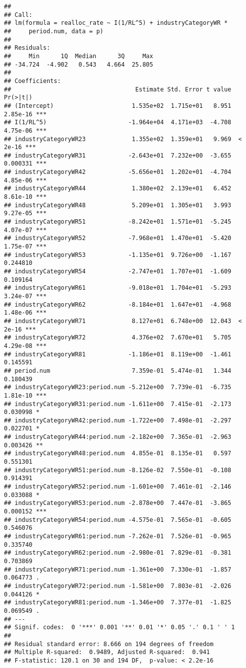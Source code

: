\documentclass[
]{article}
\begin{document}
\begin{verbatim}
## 
## Call:
## lm(formula = realloc_rate ~ I(1/RL^5) + industryCategoryWR * 
##     period.num, data = p)
## 
## Residuals:
##     Min      1Q  Median      3Q     Max 
## -34.724  -4.902   0.543   4.664  25.805 
## 
## Coefficients:
##                                   Estimate Std. Error t value Pr(>|t|)    
## (Intercept)                      1.535e+02  1.715e+01   8.951 2.85e-16 ***
## I(1/RL^5)                       -1.964e+04  4.171e+03  -4.708 4.75e-06 ***
## industryCategoryWR23             1.355e+02  1.359e+01   9.969  < 2e-16 ***
## industryCategoryWR31            -2.643e+01  7.232e+00  -3.655 0.000331 ***
## industryCategoryWR42            -5.656e+01  1.202e+01  -4.704 4.85e-06 ***
## industryCategoryWR44             1.380e+02  2.139e+01   6.452 8.61e-10 ***
## industryCategoryWR48             5.209e+01  1.305e+01   3.993 9.27e-05 ***
## industryCategoryWR51            -8.242e+01  1.571e+01  -5.245 4.07e-07 ***
## industryCategoryWR52            -7.968e+01  1.470e+01  -5.420 1.75e-07 ***
## industryCategoryWR53            -1.135e+01  9.726e+00  -1.167 0.244810    
## industryCategoryWR54            -2.747e+01  1.707e+01  -1.609 0.109164    
## industryCategoryWR61            -9.018e+01  1.704e+01  -5.293 3.24e-07 ***
## industryCategoryWR62            -8.184e+01  1.647e+01  -4.968 1.48e-06 ***
## industryCategoryWR71             8.127e+01  6.748e+00  12.043  < 2e-16 ***
## industryCategoryWR72             4.376e+02  7.670e+01   5.705 4.29e-08 ***
## industryCategoryWR81            -1.186e+01  8.119e+00  -1.461 0.145591    
## period.num                       7.359e-01  5.474e-01   1.344 0.180439    
## industryCategoryWR23:period.num -5.212e+00  7.739e-01  -6.735 1.81e-10 ***
## industryCategoryWR31:period.num -1.611e+00  7.415e-01  -2.173 0.030998 *  
## industryCategoryWR42:period.num -1.722e+00  7.498e-01  -2.297 0.022701 *  
## industryCategoryWR44:period.num -2.182e+00  7.365e-01  -2.963 0.003426 ** 
## industryCategoryWR48:period.num  4.855e-01  8.135e-01   0.597 0.551301    
## industryCategoryWR51:period.num -8.126e-02  7.550e-01  -0.108 0.914391    
## industryCategoryWR52:period.num -1.601e+00  7.461e-01  -2.146 0.033088 *  
## industryCategoryWR53:period.num -2.878e+00  7.447e-01  -3.865 0.000152 ***
## industryCategoryWR54:period.num -4.575e-01  7.565e-01  -0.605 0.546076    
## industryCategoryWR61:period.num -7.262e-01  7.526e-01  -0.965 0.335740    
## industryCategoryWR62:period.num -2.980e-01  7.829e-01  -0.381 0.703869    
## industryCategoryWR71:period.num -1.361e+00  7.330e-01  -1.857 0.064773 .  
## industryCategoryWR72:period.num -1.581e+00  7.803e-01  -2.026 0.044126 *  
## industryCategoryWR81:period.num -1.346e+00  7.377e-01  -1.825 0.069549 .  
## ---
## Signif. codes:  0 '***' 0.001 '**' 0.01 '*' 0.05 '.' 0.1 ' ' 1
## 
## Residual standard error: 8.666 on 194 degrees of freedom
## Multiple R-squared:  0.9489, Adjusted R-squared:  0.941 
## F-statistic: 120.1 on 30 and 194 DF,  p-value: < 2.2e-16
\end{verbatim}
\end{document}
